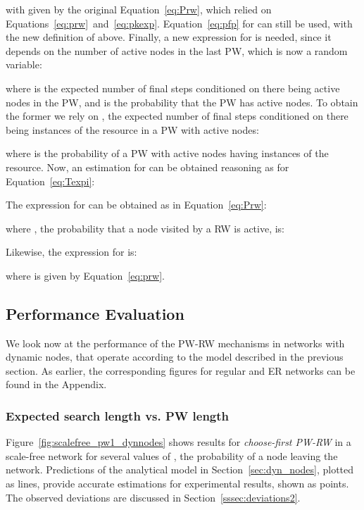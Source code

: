 \documentclass[]{elsarticle}
\begin{document}
with  given by the original Equation~\ref{eq:Prw}, which relied on Equations~\ref{eq:prw}~and~\ref{eq:pkexp}. Equation~\ref{eq:pfp} for  can still be used, with the new definition of  above.
Finally, a new expression for  is needed, since it depends on the number of active nodes  in the last PW, which is now a random variable:

where  is the expected number of final steps conditioned on there being  active nodes in the PW, and  is the probability that the PW has  active nodes.
To obtain the former we rely on , the expected number of final steps conditioned on there being  instances of the resource in a PW with  active nodes:

where  is the probability of a PW with  active nodes having  instances of the resource. Now, an estimation for  can be obtained reasoning as for Equation~\ref{eq:Texpi}:

The expression for  can be obtained as in Equation~\ref{eq:Prw}:

where , the probability that a node visited by a RW is active, is:

Likewise, the expression for  is:

where  is given by Equation~\ref{eq:prw}.



\subsection{Performance Evaluation}
We look now at the performance of the PW-RW mechanisms in networks with dynamic nodes, that operate according to the model described in the previous section. As earlier, the corresponding figures for regular and ER networks can be found in the Appendix. \\

\subsubsection{Expected search length vs. PW length}

Figure~\ref{fig:scalefree_pw1_dynnodes} shows results for \emph{choose-first PW-RW} in a scale-free network for several values of , the probability of a node leaving the network. Predictions of the analytical model in Section~\ref{sec:dyn_nodes}, plotted as lines, provide accurate estimations for experimental results, shown as points.
The observed deviations are discussed in Section~\ref{sssec:deviations2}. 
\end{document}
